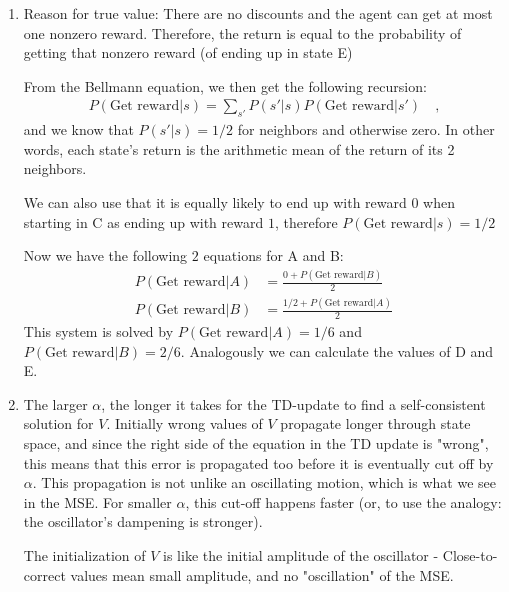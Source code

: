 \begin{solution}
\begin{enumerate}
\item
Reason for true value: There are no discounts and the agent can get at most one nonzero reward. Therefore, the 
return is equal to the probability of getting that nonzero reward (of ending up in state E)

From the Bellmann equation, we then get the following recursion:
\begin{align}
    P(\text{Get reward}|s) = \sum_{s'}P(s'|s)P(\text{Get reward}|s') \quad \text{,}
\end{align}
and we know that $P(s'|s)=1/2$ for neighbors and otherwise zero. In other words, each state's return is the arithmetic mean of the return of its 2 neighbors.

We can also use that it is equally likely to end up with reward $0$ when starting in C as ending up with reward $1$, therefore $P(\text{Get reward}|s) = 1/2$

Now we have the following $2$ equations for A and B:
\begin{align}
    P(\text{Get reward}|A) &= \frac{0 + P(\text{Get reward}|B)}{2} \\
    P(\text{Get reward}|B) &= \frac{1/2 + P(\text{Get reward}|A)}{2}
\end{align}
This system is solved by $P(\text{Get reward}|A) = 1/6$ and $P(\text{Get reward}|B) = 2/6$. Analogously we can calculate the values of D and E.

\item
The larger $\alpha$, the longer it takes for the TD-update to find a self-consistent solution for $V$. Initially wrong values of $V$ propagate longer through state space, and since the right side of the equation in the TD update is "wrong", this means that this error is propagated too before it is eventually cut off by $\alpha$. This propagation is not unlike an oscillating motion, which is what we see in the MSE. For smaller $\alpha$, this cut-off happens faster (or, to use the analogy: the oscillator's dampening is stronger).

The initialization of $V$ is like the initial amplitude of the oscillator - Close-to-correct values mean small amplitude, and no "oscillation" of the MSE.

\end{enumerate}
\end{solution}

\exerfoot
